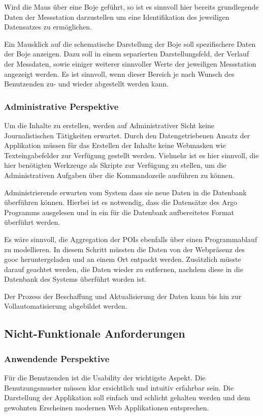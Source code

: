     Wird die Maus über eine Boje geführt, so ist es sinnvoll hier bereits grundlegende Daten der Messstation darzustellen um eine Identifikation des jeweiligen Datensatzes zu ermöglichen.
    
    Ein Mausklick auf die schematische Darstellung der Boje soll spezifischere Daten der Boje anzeigen. Dazu soll in einem separierten Darstellungsfeld, der Verlauf der Messdaten, sowie einiger weiterer sinnvoller Werte der jeweiligen Messstation angezeigt werden. Es ist sinnvoll, wenn dieser Bereich je nach Wunsch des Benutzenden zu- und wieder abgestellt werden kann. 
    
    
    \subsubsection{Administrative Perspektive}
    
    Um die Inhalte zu erstellen, werden auf Administrativer Sicht keine Journalistischen Tätigkeiten erwartet. Durch den Datengetriebenen Ansatz der Applikation müssen für das Erstellen der Inhalte keine Webmasken wie Texteingabefelder zur Verfügung gestellt werden. Vielmehr ist es hier sinnvoll, die hier benötigten Werkzeuge als Skripte zur Verfügung zu stellen, um die Administrativen Aufgaben über die Kommandozeile ausführen zu können. 
    
    Administrierende erwarten vom System dass sie neue Daten  in die Datenbank überführen können. Hierbei ist es notwendig, dass die Datensätze des Argo Programms ausgelesen und in ein für die Datenbank aufbereitetes Format überführt werden. 
    
    Es wäre sinnvoll, die Aggregation der POIs ebenfalls über einen Programmablauf zu modellieren.  In diesem Schritt müssten die Daten von der Webpräsenz des gooc heruntergeladen und an einem Ort entpackt werden. Zusätzlich müsste darauf geachtet werden, die Daten wieder zu entfernen, nachdem diese in die Datenbank des Systems überführt worden ist.
    
    Der Prozess der Beschaffung und Aktualisierung der Daten kann bis hin zur Vollautomatisierung abgebildet werden. 
    



\subsection{Nicht-Funktionale Anforderungen}
    
    \subsubsection{Anwendende Perspektive}
        Für die Benutzenden ist die Usability der wichtigste Aspekt. Die Benutzungsmuster müssen klar ersichtlich und intuitiv erfahrbar sein. Die Darstellung der Applikation soll einfach und schlicht gehalten werden und dem gewohnten Erscheinen modernen Web Applikationen entsprechen. 
        
